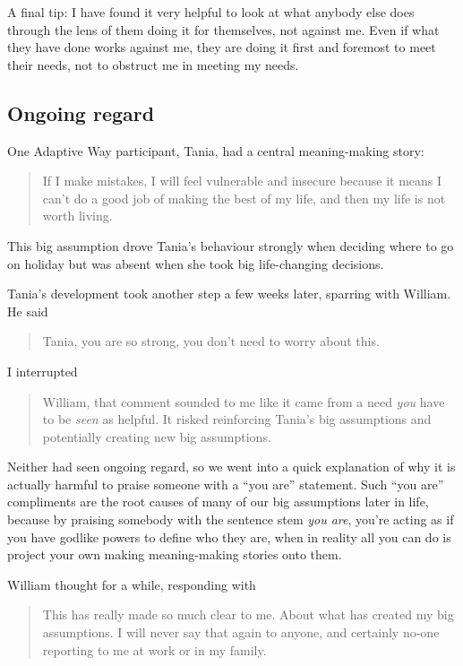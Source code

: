 A final tip: I have found it very helpful to look at what anybody else does through the lens of them doing it for themselves, not against me. Even if what they have done works against me, they are doing it first and foremost to meet their needs, not to obstruct me in meeting my needs. 
\subsection{Ongoing regard}
\label{section:ongoing-regard} 
One Adaptive Way  participant, Tania, had a central meaning\hyp{}making story: \begin{quote}If I make mistakes, I will feel vulnerable and insecure because it means I can't do a good job of making the best of my life, and then my life is not worth living.\end{quote} This big assumption drove Tania's behaviour strongly when deciding where to go on holiday but was absent when she took big life-changing decisions.


\begin{longstoryblock}
Tania's development took another step a few weeks later, sparring with William. He said \begin{quote}Tania, you are so strong, you don't need to worry about this.\end{quote} 


I interrupted \begin{quote}William, that comment sounded to me like it came from a need \emph{you} have to be \emph{seen} as helpful. It risked reinforcing Tania's big assumptions and potentially creating new big assumptions.\end{quote}


Neither had seen ongoing regard, so we went into a quick explanation of why it is actually harmful to praise someone with a “you are” statement. Such “you are” compliments are the root causes of many of our big assumptions later in life, because by praising somebody with the sentence stem \emph{you are}, you’re acting as if you have godlike powers to define who they are, when in reality all you can do is project your own making meaning\hyp{}making stories onto them.


William thought for a while, responding with \begin{quote}This has really made so much clear to me. About what has created my big assumptions. I will never say that again to anyone, and certainly no-one reporting to me at work or in my family. \end{quote}
\end{longstoryblock}


